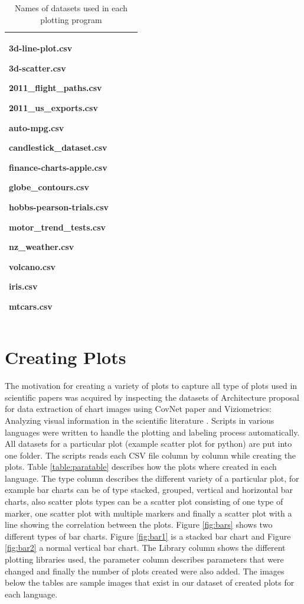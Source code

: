 \documentclass[12pt, a4paper,oneside]{report}
\begin{document}
\begin{table}[!htbp]
\begin{adjustbox}{max width=1.1\textwidth,center}
\begin{tabular}{|p{5cm}|p{3cm}|p{3cm}|p{4cm}|}
		3d-line-plot.csv \par 3d-scatter.csv \par 2011\_flight\_paths.csv \par 2011\_us\_exports.csv \par auto-mpg.csv \par candlestick\_dataset.csv \par finance-charts-apple.csv \par 
		globe\_contours.csv\par hobbs-pearson-trials.csv \par motor\_trend\_tests.csv \par 
		nz\_weather.csv \par volcano.csv \par iris.csv \par mtcars.csv	\\ \hline
		
	\end{tabular}
	
\end{adjustbox}


\caption {Names of datasets used in each plotting program}	
\label{table:1}
\end{table}


\section{Creating Plots}
The motivation for creating a variety of plots to capture all type of plots used in scientific papers was acquired by inspecting the datasets of Architecture proposal for data extraction of chart images using CovNet paper \cite{junior2017archi} and Viziometrics: Analyzing visual information in the scientific literature \cite{lee2018viziometrics}. Scripts in various languages were written to handle the plotting and labeling process automatically. All datasets for a particular plot (example scatter plot for python) are put into one folder. The scripts reads each CSV file column by column while creating the plots.
Table \ref{table:paratable} describes how the plots where created in each language. The type column describes the different variety of a particular plot, for example bar charts can be of type stacked, grouped, vertical and horizontal bar charts, also scatter plots types can be a scatter plot consisting of one type of marker, one scatter plot with multiple markers and finally a scatter plot with a line showing the correlation between the plots. 
Figure \ref{fig:bars} shows two different types of bar charts. Figure \ref{fig:bar1} is a stacked bar chart and  Figure \ref{fig:bar2} a normal vertical bar chart.
The Library column shows the different plotting libraries used, the parameter column describes parameters that were changed and finally the number of plots created were also added. The images below the tables are sample images that exist in our dataset of created plots for each language.
\end{document}
